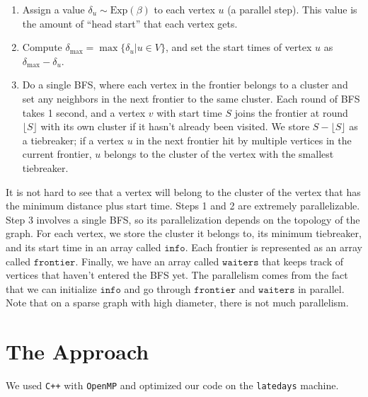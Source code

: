 \documentclass[11pt]{scrartcl}
\theoremstyle{plain}
\theoremstyle{definition}
\theoremstyle{remark}
\newcommand{\frontier}{\texttt{frontier}}
\newcommand{\info}{\texttt{info}}
\newcommand{\waiters}{\texttt{waiters}}
\begin{document}
\begin{enumerate}

\item Assign a value $\delta_u\sim\text{Exp}(\beta)$ to each vertex $u$ (a parallel step). This value is the amount of ``head start'' that each vertex gets.

\item Compute $\delta_{\text{max}} = \max\{\delta_u|u\in V\}$, and set the start times of vertex $u$ as $\delta_{\text{max}}-\delta_u$.

\item Do a single BFS, where each vertex in the frontier belongs to a cluster and set any neighbors in the next frontier to the same cluster. Each round of BFS takes 1 second, and a vertex $v$ with start time $S$ joins the frontier at round $\lfloor S \rfloor$ with its own cluster if it hasn't already been visited. We store $S-\lfloor S \rfloor$ as a tiebreaker; if a vertex $u$ in the next frontier hit by multiple vertices in the current frontier, $u$ belongs to the cluster of the vertex with the smallest tiebreaker.

\end{enumerate}
It is not hard to see that a vertex will belong to the cluster of the vertex that has the minimum distance plus start time. Steps 1 and 2 are extremely parallelizable. Step 3 involves a single BFS, so its parallelization depends on the topology of the graph. For each vertex, we store the cluster it belongs to, its minimum tiebreaker, and its start time in an array called $\info$. Each frontier is represented as an array called $\frontier$. Finally, we have an array called $\waiters$ that keeps track of vertices that haven't entered the BFS yet. The parallelism comes from the fact that we can initialize $\info$ and go through $\frontier$ and $\waiters$ in parallel. Note that on a sparse graph with high diameter, there is not much parallelism.


\section{The Approach}
We used \texttt{C++} with \texttt{OpenMP} and optimized our code on the \texttt{latedays} machine.
\end{document}
